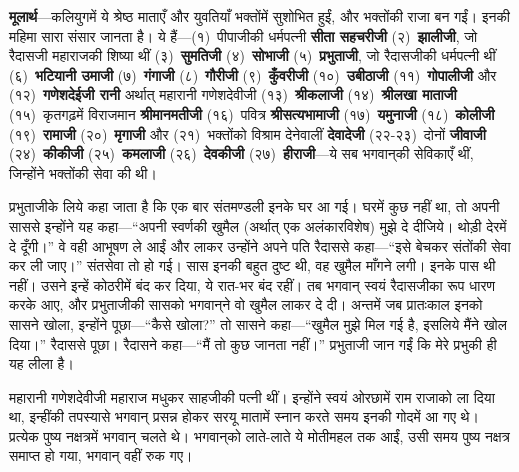 \begin{sloppypar}\justifying{}
\textbf{मूलार्थ}—कलियुगमें ये श्रेष्ठ माताएँ और युवतियाँ भक्तोंमें सुशोभित हुईं, और भक्तोंकी राजा बन गईं। इनकी महिमा सारा संसार जानता है। ये हैं—(१)~पीपाजीकी धर्मपत्नी \textbf{सीता सहचरीजी} (२)~\textbf{झालीजी}, जो रैदासजी महाराजकी शिष्या थीं (३)~\textbf{सुमतिजी} (४)~\textbf{सोभाजी} (५)~\textbf{प्रभुताजी}, जो रैदासजीकी धर्मपत्नी थीं (६)~\textbf{भटियानी उमाजी} (७)~\textbf{गंगाजी} (८)~\textbf{गौरीजी} (९)~\textbf{कुँवरीजी} (१०)~\textbf{उबीठाजी} (११)~\textbf{गोपालीजी} और (१२)~\textbf{गणेशदेईजी रानी} अर्थात् महारानी गणेशदेवीजी (१३)~\textbf{श्रीकलाजी} (१४)~\textbf{श्रीलखा माताजी} (१५)~कृतगढ़में विराजमान \textbf{श्रीमानमतीजी} (१६)~पवित्र \textbf{श्रीसत्यभामाजी} (१७)~\textbf{यमुनाजी} (१८)~\textbf{कोलीजी} (१९)~\textbf{रामाजी} (२०)~\textbf{मृगाजी} और (२१)~भक्तोंको विश्राम देनेवालीं \textbf{देवादेजी} (२२-२३)~दोनों \textbf{जीवाजी} (२४)~\textbf{कीकीजी} (२५)~\textbf{कमलाजी} (२६)~\textbf{देवकीजी} (२७)~\textbf{हीराजी}—ये सब भगवान्‌की सेविकाएँ थीं, जिन्होंने भक्तोंकी सेवा की थी।
\end{sloppypar}
\begin{sloppypar}\justifying{}
प्रभुताजीके लिये कहा जाता है कि एक बार संत\-मण्डली इनके घर आ गई। घरमें कुछ नहीं था, तो अपनी साससे इन्होंने यह कहा—“अपनी स्वर्णकी खुमैल (अर्थात् एक अलंकार\-विशेष) मुझे दे दीजिये। थोड़ी देरमें दे दूँगी।” वे वही आभूषण ले आईं और लाकर उन्होंने अपने पति रैदाससे कहा—“इसे बेचकर संतोंकी सेवा कर ली जाए।” संत\-सेवा तो हो गई। सास इनकी बहुत दुष्ट थी, वह खुमैल माँगने लगी। इनके पास थी नहीं। उसने इन्हें कोठरीमें बंद कर दिया, ये रात-भर बंद रहीं। तब भगवान् स्वयं रैदासजीका रूप धारण करके आए, और प्रभुताजीकी सासको भगवान्‌ने वो खुमैल लाकर दे दी। अन्तमें जब प्रातःकाल इनको सासने खोला, इन्होंने पूछा—“कैसे खोला?” तो सासने कहा—“खुमैल मुझे मिल गई है, इसलिये मैंने खोल दिया।” रैदाससे पूछा। रैदासने कहा—“मैं तो कुछ जानता नहीं।” प्रभुताजी जान गईं कि मेरे प्रभुकी ही यह लीला है।
\end{sloppypar}
\begin{sloppypar}\justifying{}
महारानी गणेशदेवीजी महाराज मधुकर साहजीकी पत्नी थीं। इन्होंने स्वयं ओरछामें राम राजाको ला दिया था, इन्हींकी तपस्यासे भगवान् प्रसन्न होकर सरयू मातामें स्नान करते समय इनकी गोदमें आ गए थे। प्रत्येक पुष्य नक्षत्रमें भगवान् चलते थे। भगवान्‌को लाते-लाते ये मोतीमहल तक आईं, उसी समय पुष्य नक्षत्र समाप्त हो गया, भगवान् वहीं रुक गए।
\end{sloppypar}


